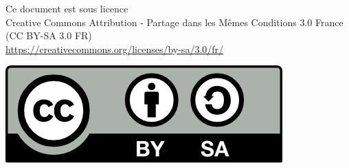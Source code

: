 \documentclass[10pt]{book}
\begin{document}
\begin{titlepage}
\begin{center}
\begin{minipage}{0.80\textwidth}
\footnotesize
Ce document est sous licence \\
Creative Commons Attribution - Partage dans les Mêmes Conditions 3.0 France \\
(CC BY-SA 3.0 FR) \\
\url{https://creativecommons.org/licenses/by-sa/3.0/fr/}
\end{minipage}
\begin{minipage}{0.15\textwidth}
\includegraphics{img/logo_CC-BY-SA.png}
\end{minipage}

\end{center}
\end{titlepage}


\setcounter{tocdepth}{1}
\tableofcontents

\clearpage

\setcounter{chapter}{11}








\appendix


\end{document}
